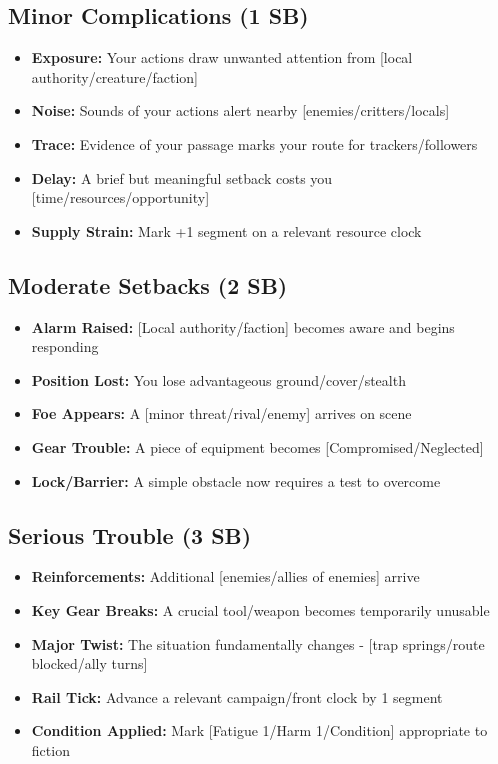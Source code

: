 \subsection*{Minor Complications (1 SB)}
\begin{itemize}
\item \textbf{Exposure:} Your actions draw unwanted attention from [local authority/creature/faction]
\item \textbf{Noise:} Sounds of your actions alert nearby [enemies/critters/locals]
\item \textbf{Trace:} Evidence of your passage marks your route for trackers/followers
\item \textbf{Delay:} A brief but meaningful setback costs you [time/resources/opportunity]
\item \textbf{Supply Strain:} Mark +1 segment on a relevant resource clock
\end{itemize}

\subsection*{Moderate Setbacks (2 SB)}
\begin{itemize}
\item \textbf{Alarm Raised:} [Local authority/faction] becomes aware and begins responding
\item \textbf{Position Lost:} You lose advantageous ground/cover/stealth
\item \textbf{Foe Appears:} A [minor threat/rival/enemy] arrives on scene
\item \textbf{Gear Trouble:} A piece of equipment becomes [Compromised/Neglected]
\item \textbf{Lock/Barrier:} A simple obstacle now requires a test to overcome
\end{itemize}

\subsection*{Serious Trouble (3 SB)}
\begin{itemize}
\item \textbf{Reinforcements:} Additional [enemies/allies of enemies] arrive
\item \textbf{Key Gear Breaks:} A crucial tool/weapon becomes temporarily unusable
\item \textbf{Major Twist:} The situation fundamentally changes - [trap springs/route blocked/ally turns]
\item \textbf{Rail Tick:} Advance a relevant campaign/front clock by 1 segment
\item \textbf{Condition Applied:} Mark [Fatigue 1/Harm 1/Condition] appropriate to fiction
\end{itemize}

